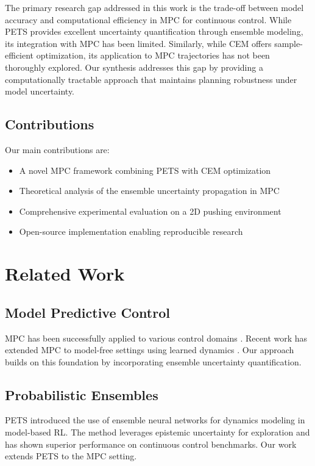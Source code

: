 \documentclass[10pt,twocolumn,letterpaper]{article}
\begin{document}
The primary research gap addressed in this work is the trade-off between model accuracy and computational efficiency in MPC for continuous control. While PETS provides excellent uncertainty quantification through ensemble modeling, its integration with MPC has been limited. Similarly, while CEM offers sample-efficient optimization, its application to MPC trajectories has not been thoroughly explored. Our synthesis addresses this gap by providing a computationally tractable approach that maintains planning robustness under model uncertainty.

\subsection{Contributions}

Our main contributions are:
\begin{itemize}
\item A novel MPC framework combining PETS with CEM optimization
\item Theoretical analysis of the ensemble uncertainty propagation in MPC
\item Comprehensive experimental evaluation on a 2D pushing environment
\item Open-source implementation enabling reproducible research
\end{itemize}

\section{Related Work}

\subsection{Model Predictive Control}

MPC has been successfully applied to various control domains \cite{rawlings2017model}. Recent work has extended MPC to model-free settings using learned dynamics \cite{nagabandi2018neural}. Our approach builds on this foundation by incorporating ensemble uncertainty quantification.

\subsection{Probabilistic Ensembles}

PETS \cite{chua2018deep} introduced the use of ensemble neural networks for dynamics modeling in model-based RL. The method leverages epistemic uncertainty for exploration and has shown superior performance on continuous control benchmarks. Our work extends PETS to the MPC setting.
\end{document}
